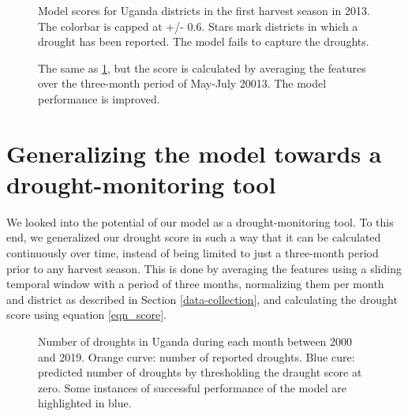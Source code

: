 \documentclass[10pt,parskip=half,
toc=sectionentrywithdots,
bibliography=totocnumbered,
captions=tableheading,numbers=noendperiod]{scrartcl}
\begin{document}
\begin{figure}[H]\begin{center}\end{center}\caption{Model scores for Uganda districts in the first harvest season in 2013.
The colorbar is capped at +/- 0.6. Stars mark districts in which a
drought has been reported. The model fails to capture the droughts.}\label{fig_map2013a}\end{figure}

\begin{figure}[H]\begin{center}\end{center}\caption{The same as \ref{fig_map2013a}, but the score is calculated by averaging
the features over the three-month period of May-July 20013. The model
performance is improved.}\label{fig_map2013b}\end{figure}

\hypertarget{generalizing-the-model-towards-a-drought-monitoring-tool}{%
\section{Generalizing the model towards a drought-monitoring
tool}\label{generalizing-the-model-towards-a-drought-monitoring-tool}}

We looked into the potential of our model as a drought-monitoring tool.
To this end, we generalized our drought score in such a way that it can
be calculated continuously over time, instead of being limited to just a
three-month period prior to any harvest season. This is done by
averaging the features using a sliding temporal window with a period of
three months, normalizing them per month and district as described in
Section \ref{data-collection}, and calculating the drought score using
equation \ref{eqn_score}.

\begin{figure}[H]\begin{center}\end{center}\caption{Number of droughts in Uganda during each month between 2000 and 2019.
Orange curve: number of reported droughts. Blue cure: predicted number
of droughts by thresholding the draught score at zero. Some instances of
successful performance of the model are highlighted in blue.}\label{fig_droughtcount}\end{figure}
\end{document}

